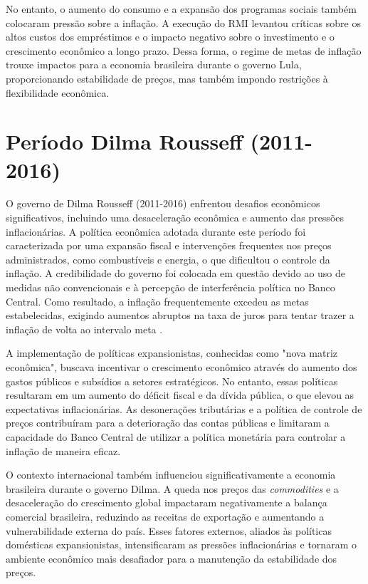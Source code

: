 \documentclass[12pt,oneside,a4paper,chapter=TITLE,english,brazil,sumario=abnt-6027-2012]{abntex2}
\begin{document}
No entanto, o aumento do consumo e a expansão dos programas sociais também colocaram pressão sobre a inflação. A execução do RMI levantou críticas sobre os altos custos dos empréstimos e o impacto negativo sobre o investimento e o crescimento econômico a longo prazo. Dessa forma, o regime de metas de inflação trouxe impactos para a economia brasileira durante o governo Lula, proporcionando estabilidade de preços, mas também impondo restrições à flexibilidade econômica.


\section{Período Dilma Rousseff (2011-2016)}
O governo de Dilma Rousseff (2011-2016) enfrentou desafios econômicos significativos, incluindo uma desaceleração econômica e aumento das pressões inflacionárias. A política econômica adotada durante este período foi caracterizada por uma expansão fiscal e intervenções frequentes nos preços administrados, como combustíveis e energia, o que dificultou o controle da inflação. A credibilidade do governo foi colocada em questão devido ao uso de medidas não convencionais e à percepção de interferência política no Banco Central. Como resultado, a inflação frequentemente excedeu as metas estabelecidas, exigindo aumentos abruptos na taxa de juros para tentar trazer a inflação de volta ao intervalo meta \cite{carvalho_2016_growth}.

A implementação de políticas expansionistas, conhecidas como "nova matriz econômica", buscava incentivar o crescimento econômico através do aumento dos gastos públicos e subsídios a setores estratégicos. No entanto, essas políticas resultaram em um aumento do déficit fiscal e da dívida pública, o que elevou as expectativas inflacionárias. As desonerações tributárias e a política de controle de preços contribuíram para a deterioração das contas públicas e limitaram a capacidade do Banco Central de utilizar a política monetária para controlar a inflação de maneira eficaz.

O contexto internacional também influenciou significativamente a economia brasileira durante o governo Dilma. A queda nos preços das \textit{commodities} e a desaceleração do crescimento global impactaram negativamente a balança comercial brasileira, reduzindo as receitas de exportação e aumentando a vulnerabilidade externa do país. Esses fatores externos, aliados às políticas domésticas expansionistas, intensificaram as pressões inflacionárias e tornaram o ambiente econômico mais desafiador para a manutenção da estabilidade dos preços.
\end{document}
